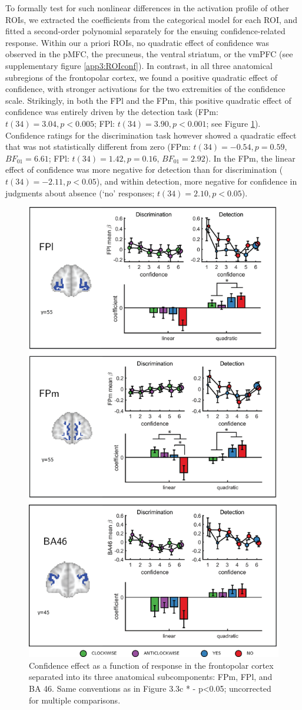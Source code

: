\documentclass[12pt,twoside]{reedthesis}
\begin{document}
To formally test for such nonlinear differences in the activation profile of other ROIs, we extracted the coefficients from the categorical model for each ROI, and fitted a second-order polynomial separately for the ensuing confidence-related response. Within our a priori ROIs, no quadratic effect of confidence was observed in the pMFC, the precuneus, the ventral striatum, or the vmPFC (see supplementary figure \ref{app3:ROIconf}). In contrast, in all three anatomical subregions of the frontopolar cortex, we found a positive quadratic effect of confidence, with stronger activations for the two extremities of the confidence scale. Strikingly, in both the FPl and the FPm, this positive quadratic effect of confidence was entirely driven by the detection task (FPm: \(t(34)=3.04, p<0.005\); FPl: \(t(34)=3.90, p<0.001\); see Figure \ref{fig:ch3-exp1-FPl}). Confidence ratings for the discrimination task however showed a quadratic effect that was not statistically different from zero (FPm: \(t(34)=-0.54, p=0.59\), \(BF_{01}=6.61\); FPl: \(t(34)=1.42, p=0.16\), \(BF_{01}=2.92\)). In the FPm, the linear effect of confidence was more negative for detection than for discrimination (\(t(34) = -2.11, p<0.05\)), and within detection, more negative for confidence in judgments about absence (`no' responses; \(t(34) = 2.10, p<0.05\)).
\begin{figure}
\includegraphics[width=0.7\linewidth]{figure/ch3/figure4} \caption[Effect of confidence in the frontopolar cortex]{Confidence effect as a function of response in the frontopolar cortex separated into its three anatomical subcomponents: FPm, FPl, and BA 46. Same conventions as in Figure 3.3c * - p<0.05; uncorrected for multiple comparisons.}\label{fig:ch3-exp1-FPl}
\end{figure}
\end{document}

